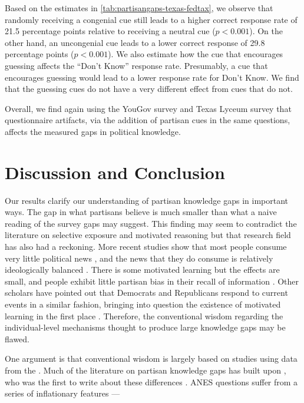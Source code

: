 \documentclass[12pt, letterpaper]{article}
\begin{document}
Based on the estimates in \cref{tab:partisangaps-texas-fedtax}, we observe that randomly receiving a congenial cue still leads to a higher correct response rate of 21.5 percentage points relative to receiving a neutral cue ($p<0.001$). On the other hand, an uncongenial cue leads to a lower correct response of 29.8 percentage points ($p<0.001$).
We also estimate how the cue that encourages guessing affects the ``Don't Know'' response rate. Presumably, a cue that encourages guessing would lead to a lower response rate for Don't Know. We find that the guessing cues do not have a very different effect from cues that do not. 

Overall, we find again using the YouGov survey and Texas Lyceum survey that questionnaire artifacts, via the addition of partisan cues in the same questions, affects the measured gaps in political knowledge. 


\clearpage
\section*{Discussion and Conclusion}

Our results clarify our understanding of partisan knowledge gaps in important ways. The gap in what partisans believe is much smaller than what a naive reading of the survey gaps may suggest. This finding may seem to contradict the literature on selective exposure and motivated reasoning but that research field has also had a reckoning. More recent studies show that most people consume very little political news \citep{Prior2007,flaxmanetal_2016}, and the news that they do consume is relatively ideologically balanced \citep{flaxmanetal_2016,garzetal_2018,gentzkowshapiro_2011,guess_2020}. There is some motivated learning \citep{hill_2017,jerit2012partisan,khanna2018motivated} but the effects are small, and people exhibit little partisan bias in their recall of information \citep{khanna2018motivated}. Other scholars have pointed out that Democrats and Republicans respond to current events in a similar fashion, bringing into question the existence of motivated learning in the first place \citep{gerber_annual_review,kernell_2019}. Therefore, the conventional wisdom regarding the individual-level mechanisms thought to produce large knowledge gaps may be flawed.

One argument is that conventional wisdom is largely based on studies using data from the \citet{anes_gen}. Much of the literature on partisan knowledge gaps has built upon \citet{bartels_2002}, who was the first to write about these differences \citep{bullocklenz_2019}. ANES questions suffer from a series of inflationary features --- 
\end{document}

